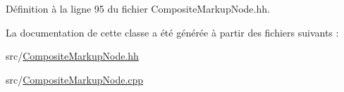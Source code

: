 Définition à la ligne 95 du fichier CompositeMarkupNode.hh.



La documentation de cette classe a été générée à partir des fichiers suivants :\begin{DoxyCompactItemize}
\item 
src/\hyperlink{_composite_markup_node_8hh}{CompositeMarkupNode.hh}\item 
src/\hyperlink{_composite_markup_node_8cpp}{CompositeMarkupNode.cpp}\end{DoxyCompactItemize}
